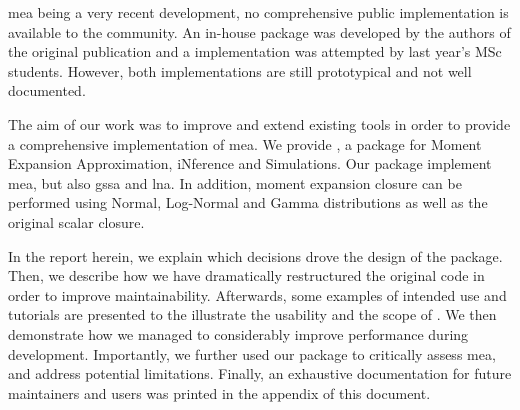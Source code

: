 \gls{mea} being a very recent development, no comprehensive public implementation is available to the community.
An in-house \mat{} package was developed by the authors of the original publication and a \py{} implementation was attempted by last year's MSc students\cite{babtie_moment_????}.
However, both implementations are still prototypical and not well documented.
 
The aim of our work was to improve and extend existing tools in order to provide a comprehensive implementation of
\gls{mea}.
We provide \means{}, a \py{} package for Moment Expansion Approximation, iNference and Simulations.
Our package implement \gls{mea}, but also \gls{gssa} and \gls{lna}.
In addition, moment expansion closure can be performed using Normal, Log-Normal and Gamma distributions as well as the original scalar closure.

In the report herein, we explain which decisions drove the design of the package.
Then, we describe how we have dramatically restructured the original code in order to improve maintainability.
Afterwards, some examples of intended use and tutorials are presented to the illustrate the usability and the scope of \means.
We then demonstrate how we managed to considerably improve performance during development.
Importantly, we further used our package to critically assess \gls{mea}, and address potential limitations.
Finally, an exhaustive documentation for future maintainers and users was printed in the appendix of this document.